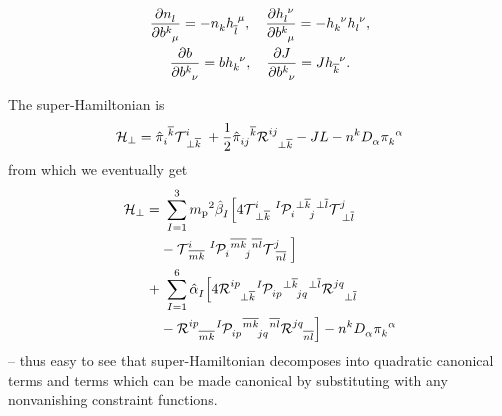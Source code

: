 \documentclass[aps,prd,reprint,preprintnumbers,superscriptaddress,showpacs,floatfix]{revtex4-2}
\begin{document}
\begin{equation}
  \begin{gathered}
    \frac{\partial\tensor{n}{_l}}{\partial\tensor{b}{^k_\mu}}=-\tensor{n}{_k}\tensor{h}{_{\overline{l}}^\mu}, \quad \frac{\partial\tensor{h}{_l^\nu}}{\partial\tensor{b}{^k_\mu}}=-\tensor{h}{_k^\nu}\tensor{h}{_l^\nu},\\
    \frac{\partial b}{\partial\tensor{b}{^k_\nu}}=b\tensor{h}{_k^\nu}, \quad \frac{\partial J}{\partial\tensor{b}{^k_\nu}}=J\tensor{h}{_{\overline{k}}^\nu}.
  \end{gathered}
  \label{<+label+>}
\end{equation}

The super-Hamiltonian is
\begin{equation}
  \mathcal{  H}_{\perp}=\tensor{\hat{\pi}}{_i^{\overline{k}}}\tensor{\mathcal{  T}}{^i_{\perp\overline{k}}}+\frac{1}{2}\tensor{\hat{\pi}}{_{ij}^{\overline{k}}}\tensor{\mathcal{  R}}{^{ij}_{\perp\overline{k}}}-JL-\tensor{n}{^k}\tensor{D}{_\alpha}\tensor{\pi}{_k^\alpha}
  \label{<+label+>}
\end{equation}
from which we eventually get
\begin{equation}
\begin{aligned}
  \mathcal{  H}_{\perp}=&\ \sum_{I=1}^{3}{m_\text{p}}^2\tensor{\hat{\beta}}{_{I}}\Big[4\tensor{\mathcal{  T}}{^i_{\perp\overline{k}}}\tensor[^I]{\mathcal{  P}}{_i^{\perp\overline{k}}_j^{\perp\overline{l}}}\tensor{\mathcal{  T}}{^j_{\perp\overline{l}}}\\
  &-\tensor{\mathcal{  T}}{^i_{\overline{mk}}}\tensor[^I]{\mathcal{  P}}{_i^{\overline{mk}}_j^{\overline{nl}}}\tensor{\mathcal{  T}}{^j_{\overline{nl}}}\Big]\\
  +&\ \sum_{I=1}^{6}\tensor{\hat{\alpha}}{_{I}}\Big[4\tensor{\mathcal{  R}}{^{ip}_{\perp\overline{k}}}\tensor[^I]{\mathcal{  P}}{_{ip}^{\perp\overline{k}}_{jq}^{\perp\overline{l}}}\tensor{\mathcal{  R}}{^{jq}_{\perp\overline{l}}}\\
  &-\tensor{\mathcal{  R}}{^{ip}_{\overline{mk}}}\tensor[^I]{\mathcal{  P}}{_{ip}^{\overline{mk}}_{jq}^{\overline{nl}}}\tensor{\mathcal{  R}}{^{jq}_{\overline{nl}}}\Big]-\tensor{n}{^k}\tensor{D}{_\alpha}\tensor{\pi}{_k^\alpha}\\
  \label{<+label+>}
\end{aligned}
\end{equation}
-- thus easy to see that super-Hamiltonian decomposes into quadratic canonical terms and terms which can be made canonical by substituting with any nonvanishing constraint functions.
\end{document}

